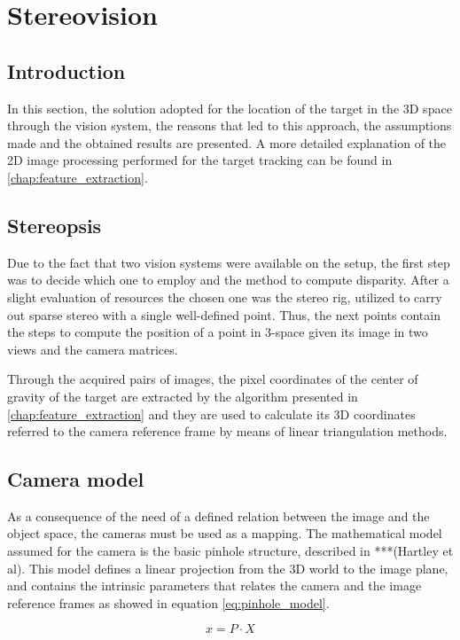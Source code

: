
\chapter{Stereovision} %
\label{chap:stereopsis}

\section{Introduction}
In this section, the solution adopted for the location of the target in the 3D space through the vision system, the reasons that led to this approach, the assumptions made and the obtained results are presented. 
A more detailed explanation of the 2D image processing performed for the target tracking can be found in \ref{chap:feature_extraction}.

\section{Stereopsis}
Due to the fact that two vision systems were available on the setup, the first step was to decide which one to employ and the method to compute disparity. 
After a slight evaluation of resources the chosen one was the stereo rig, utilized to carry out sparse stereo with a single well-defined point. 
Thus, the next points contain the steps to compute the position of a point in 3-space given its image in two views and the camera matrices. 

Through the acquired pairs of images, the pixel coordinates of the center of gravity of the target are extracted by the algorithm presented in \ref{chap:feature_extraction} and they are used to calculate its 3D coordinates referred to the camera reference frame by means of linear triangulation methods.

\section{Camera model}
As a consequence of the need of a defined relation between the image and the object space, the cameras must be used as a mapping. 
The mathematical model assumed for the camera is the basic pinhole structure, described in ***(Hartley et al). 
This model defines a linear projection from the 3D world to the image plane, and contains the intrinsic parameters that relates the camera and the image reference frames as showed in equation \ref{eq:pinhole_model}. 

\begin{equation}
x = P·X
\label{eq:pinhole_model}
\end{equation}  

